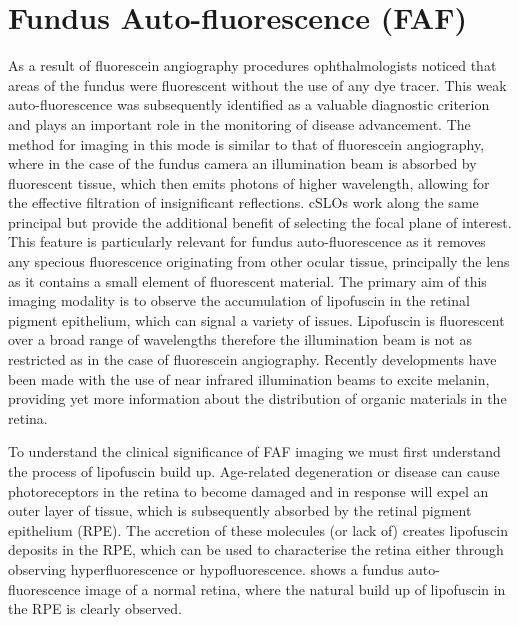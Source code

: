 \section{Fundus Auto-fluorescence (FAF)}

As a result of fluorescein angiography procedures ophthalmologists noticed that areas of the fundus were fluorescent without the use of any dye tracer. This weak auto-fluorescence was subsequently identified as a valuable diagnostic criterion and plays an important role in the monitoring of disease advancement. The method for imaging in this mode is similar to that of fluorescein angiography, where in the case of the fundus camera an illumination beam is absorbed by fluorescent tissue, which then emits photons of higher wavelength, allowing for the effective filtration of insignificant reflections. cSLOs work along the same principal but provide the additional benefit of selecting the focal plane of interest. This feature is particularly relevant for fundus auto-fluorescence as it removes any specious fluorescence originating from other ocular tissue, principally the lens as it contains a small element of fluorescent material. The primary aim of this imaging modality is to observe the accumulation of lipofuscin in the retinal pigment epithelium, which can signal a variety of issues. Lipofuscin is fluorescent over a broad range of wavelengths therefore the illumination beam is not as restricted as in the case of fluorescein angiography. Recently developments have been made with the use of near infrared illumination beams to excite melanin, providing yet more information about the distribution of organic materials in the retina.

To understand the clinical significance of FAF imaging we must first understand the process of lipofuscin build up. Age-related degeneration or disease can cause photoreceptors in the retina to become damaged and in response will expel an outer layer of tissue, which is subsequently absorbed by the retinal pigment epithelium (RPE). The accretion of these molecules (or lack of) creates lipofuscin deposits in the RPE, which can be used to characterise the retina either through observing hyperfluorescence or hypofluorescence. shows a fundus auto-fluorescence image of a normal retina, where the natural build up of lipofuscin in the RPE is clearly observed.

